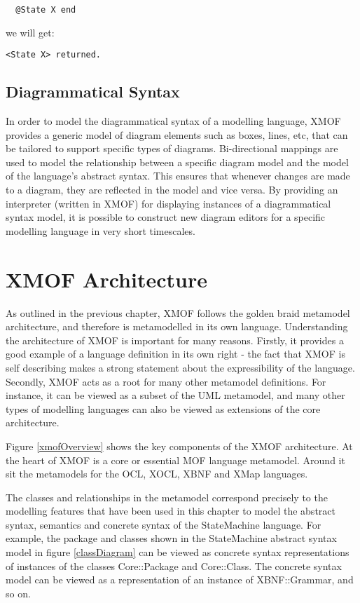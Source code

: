 \small
\begin{verbatim}
  @State X end
\end{verbatim}
\normalsize

\noindent we will get:

\small
\begin{verbatim}
<State X> returned.
\end{verbatim}
\normalsize

\subsection{Diagrammatical Syntax}

In order to model the diagrammatical syntax of a modelling
language, XMOF provides a generic model of diagram elements such
as boxes, lines, etc, that can be tailored to support specific
types of diagrams. Bi-directional mappings are used to model the
relationship between a specific diagram model and the model of the
language's abstract syntax. This ensures that whenever changes are
made to a diagram, they are reflected in the model and vice versa.
By providing an interpreter (written in XMOF) for displaying
instances of a diagrammatical syntax model, it is possible to
construct new diagram editors for a specific modelling language in
very short timescales.

\section{XMOF Architecture}

As outlined in the previous chapter, XMOF follows the golden braid
metamodel architecture, and therefore is metamodelled in its own
language. Understanding the architecture of XMOF is important for
many reasons. Firstly, it provides a good example of a language
definition in its own right - the fact that XMOF is self
describing makes a strong statement about the expressibility of
the language. Secondly, XMOF acts as a root for many other
metamodel definitions. For instance, it can be viewed as a subset
of the UML metamodel, and many other types of modelling languages
can also be viewed as extensions of the core architecture.

Figure \ref{xmofOverview} shows the key components of the XMOF
architecture. At the heart of XMOF is a core or essential MOF
language metamodel. Around it sit the metamodels for the OCL,
XOCL, XBNF and XMap languages.

The classes and relationships in the metamodel correspond
precisely to the modelling features that have been used in this
chapter to model the abstract syntax, semantics and concrete
syntax of the StateMachine language. For example, the package and
classes shown in the StateMachine abstract syntax model in figure
\ref{classDiagram} can be viewed as concrete syntax
representations of instances of the classes Core::Package and
Core::Class. The concrete syntax model can be viewed as a
representation of an instance of XBNF::Grammar, and so on.

